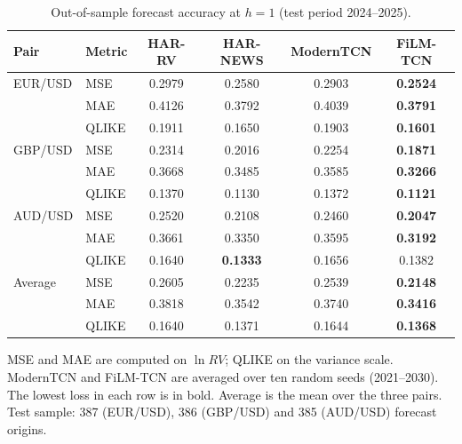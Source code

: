 %
\providecommand{\FiLMTCN}{FiLM-TCN}

\begin{table}[t]
  \centering
  \setlength{\tabcolsep}{5pt}
  \begin{threeparttable}
  \caption{Out-of-sample forecast accuracy at $h=1$ (test period 2024--2025).}
  \label{tab:accuracy-h1}
  \begin{tabular}{llcccc}
    \toprule
    Pair & Metric & HAR-RV & HAR-NEWS & ModernTCN & \FiLMTCN{} \\
    \midrule
    EUR/USD            & MSE   & 0.2979 & 0.2580 & 0.2903 & \textbf{0.2524} \\
                       & MAE   & 0.4126 & 0.3792 & 0.4039 & \textbf{0.3791} \\
                       & QLIKE & 0.1911 & 0.1650 & 0.1903 & \textbf{0.1601} \\
    \addlinespace
    GBP/USD            & MSE   & 0.2314 & 0.2016 & 0.2254 & \textbf{0.1871} \\
                       & MAE   & 0.3668 & 0.3485 & 0.3585 & \textbf{0.3266} \\
                       & QLIKE & 0.1370 & 0.1130 & 0.1372 & \textbf{0.1121} \\
    \addlinespace
    AUD/USD            & MSE   & 0.2520 & 0.2108 & 0.2460 & \textbf{0.2047} \\
                       & MAE   & 0.3661 & 0.3350 & 0.3595 & \textbf{0.3192} \\
                       & QLIKE & 0.1640 & \textbf{0.1333} & 0.1656 & 0.1382 \\
    \addlinespace
    Average            & MSE   & 0.2605 & 0.2235 & 0.2539 & \textbf{0.2148} \\
                       & MAE   & 0.3818 & 0.3542 & 0.3740 & \textbf{0.3416} \\
                       & QLIKE & 0.1640 & 0.1371 & 0.1644 & \textbf{0.1368} \\
    \bottomrule
  \end{tabular}
  \begin{tablenotes}[flushleft]\footnotesize
    \item MSE and MAE are computed on $\ln RV$; QLIKE on the variance scale. ModernTCN and \FiLMTCN{} are averaged over ten random seeds (2021--2030). The lowest loss in each row is in bold. Average is the mean over the three pairs. Test sample: 387 (EUR/USD), 386 (GBP/USD) and 385 (AUD/USD) forecast origins.
  \end{tablenotes}
  \end{threeparttable}
\end{table}

